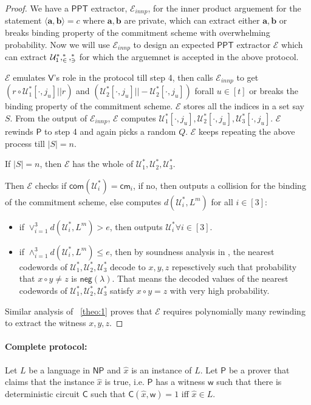 \documentclass[runningheads]{llncs}
\newcommand{\innp}[2]{\langle #1,#2\rangle}
\def\ppt{\mathsf{PPT}}
\def\extrac{\mathcal{E}} %
\def\prover{\mathsf{P}}
\def\verifier{\mathsf{V}}
\def\cm{\mathsf{cm}} %
\def\com{\mathsf{com}} %
\def\negl{\mathsf{neg}}
\def\NP{\mathsf{NP}}
\def\C{\mathsf{C}} %
\def\wit{\mathsf{w}} %
\def\stmt{\hat{x}} %
\def\calU{\mathcal{U}}
\begin{document}
	\begin{proof}
	We have a $\ppt$ extractor, $\extrac_{innp}$, for the inner product arguement for the statement $\innp{\bm{a}}{\bm{b}}=c$ where $\bm{a},\bm{b}$ are private, which can extract either $\bm{a}, \bm{b}$ or breaks binding property of the commitment scheme with overwhelming probability. Now we will use $\extrac_{innp}$ to design an expected $\ppt$ extractor $\extrac$ which can extract $\calU^*_1, \cal^*_2, \cal^*_3$ for which the arguemnet is accepted in the above protocol.
	
	$\extrac$ emulates $\verifier$'s role in the protocol till step 4, then calls $\extrac_{innp}$ to get $(r\circ \calU^*_1[\cdot,j_u]||r)$ and $(\calU^*_2[\cdot,j_u]||-\calU^*_2[\cdot,j_u])$ forall $u\in [t]$ or breaks the binding property of the commitment scheme. $\extrac$ stores all the indices in a set say $S$. From the output of $\extrac_{innp}$, $\extrac$ computes $\calU^*_1[\cdot,j_u], \calU^*_2[\cdot,j_u],\calU^*_3[\cdot,j_u]$. $\extrac$ rewinds $\prover$ to step 4 and again picks a random $Q$. $\extrac$ keeps repeating the above process till $|S|=n$.
	 
	If $|S|=n$, then $\extrac$ has the whole of $\calU^*_1, \calU^*_2, \calU^*_3$.
	
	Then $\extrac$ checks if $\com(\calU^*_i)=\cm_i$, if no, then outputs a collision for the binding of the commitment scheme, else computes $d(\calU^*_i, L^m)$ for all $i \in [3]$:
	
	\begin{itemize}
		\item if $\vee_{i=1}^{3} d(\calU^*_i, L^m) > e$, then outputs $\calU^*_i \forall i\in [3]$.
		
		\item if $\wedge_{i=1}^3 d(\calU^*_i, L^m) \leq e$, then by soundness analysis in \cite{Ligero2017}, the nearest codewords of $\calU^*_1, \calU^*_2, \calU^*_3$ decode to $x, y, z$ repesctively such that probability that $x \circ y \neq z$ is $\negl(\lambda)$. That means the decoded values of the nearest codewords of $\calU^*_1, \calU^*_2, \calU^*_3$ satisfy $x\circ y = z$ with very high probability.
	\end{itemize}
	 
	Similar analysis of ~\ref{theo:1} proves that $\extrac$ requires polynomially many rewinding to extract the witness $x, y, z$.
	\end{proof}
	
		
	\paragraph{\textbf{Complete protocol:}} Let $L$ be a language in $\NP$ and $\stmt$ is an instance of $L$. Let $\prover$ be a prover that claims that the instance $\stmt$ is true, i.e. $\prover$ has a witness $\wit$ such that there is deterministic circuit $\C$ such that $\C(\stmt,\wit)=1$ iff $\stmt \in L$. 
	
\end{document}
